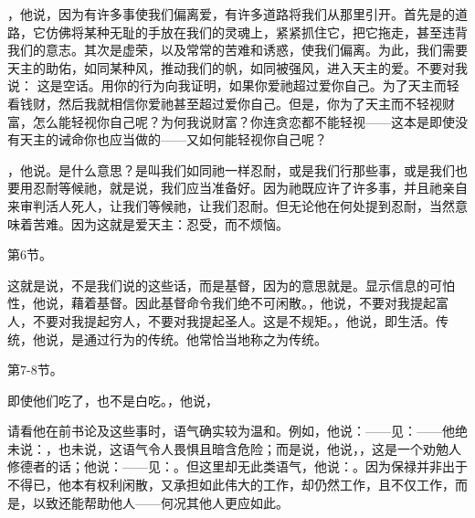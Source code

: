 ，他说，因为有许多事使我们偏离爱，有许多道路将我们从那里引开。首先是的道路，它仿佛将某种无耻的手放在我们的灵魂上，紧紧抓住它，把它拖走，甚至违背我们的意志。其次是虚荣，以及常常的苦难和诱惑，使我们偏离。为此，我们需要天主的助佑，如同某种风，推动我们的帆，如同被强风，进入天主的爱。不要对我说： 这是空话。用你的行为向我证明，如果你爱祂超过爱你自己。为了天主而轻看钱财，然后我就相信你爱祂甚至超过爱你自己。但是，你为了天主而不轻视财富，怎么能轻视你自己呢？为何我说财富？你连贪恋都不能轻视——这本是即使没有天主的诫命你也应当做的——又如何能轻视你自己呢？\par

，他说。是什么意思？是叫我们如同祂一样忍耐，或是我们行那些事，或是我们也要用忍耐等候祂，就是说，我们应当准备好。因为祂既应许了许多事，并且祂亲自来审判活人死人，让我们等候祂，让我们忍耐。但无论他在何处提到忍耐，当然意味着苦难。因为这就是爱天主：忍受，而不烦恼。\par

第6节。\par

这就是说，不是我们说的这些话，而是基督，因为的意思就是。显示信息的可怕性，他说，藉着基督。因此基督命令我们绝不可闲散。，他说，不要对我提起富人，不要对我提起穷人，不要对我提起圣人。这是不规矩。，他说，即生活。传统，他说，是通过行为的传统。他常恰当地称之为传统。\par

第7-8节。\par

即使他们吃了，也不是白吃。，他说，\par

\par

请看他在前书论及这些事时，语气确实较为温和。例如，他说：——见：——他绝未说：，也未说，这语气令人畏惧且暗含危险；而是说，他说，，这是一个劝勉人修德者的话；他说：——见：。但这里却无此类语气，他说：。因为保禄并非出于不得已，他本有权利闲散，又承担如此伟大的工作，却仍然工作，且不仅工作，而是，以致还能帮助他人——何况其他人更应如此。\par

